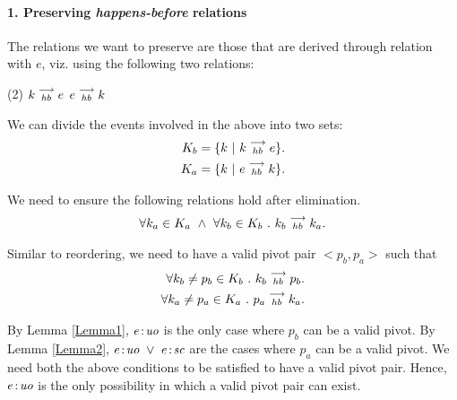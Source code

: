 \paragraph{1. Preserving \emph{happens-before} relations}
        The relations we want to preserve are those that are derived through relation with $e$, viz. using the following two relations:
        \begin{tasks}(2)
            \task $k\stackrel{\longrightarrow}{_{hb}}e$
            \task $e\stackrel{\longrightarrow}{_{hb}}k$
        \end{tasks}

        We can divide the events involved in the above into two sets:
        \begin{align*}
            K_b = \{k \ | \ k\stackrel{\longrightarrow}{_{hb}}e \}. \\
            K_a = \{k \ | \ e\stackrel{\longrightarrow}{_{hb}}k \}. 
        \end{align*}

        We need to ensure the following relations hold after elimination.
        \begin{align*}
            \forall k_a \in K_a \ \wedge \ \forall k_b \in K_b \ . \ \reln{k_b}{hb}{k_a}.
        \end{align*}

        Similar to reordering, we need to have a valid pivot pair $<p_b, p_a>$ such that 
        \begin{align*}
            \forall k_b \neq p_b \in K_b \ . \ k_b\stackrel{\longrightarrow}{_{hb}}p_b. \\
            \forall k_a \neq p_a \in K_a \ . \ p_a\stackrel{\longrightarrow}{_{hb}}k_a. 
        \end{align*}

        By Lemma \ref{Lemma1}, $e\!:\!\textit{uo}$ is the only case where $p_b$ can be a valid pivot. 
        By Lemma \ref{Lemma2}, $e\!:\!\textit{uo} \ \vee \ e\!:\!\textit{sc}$ are the cases where $p_a$ can be a valid pivot. 
        We need both the above conditions to be satisfied to have a valid pivot pair. 
        Hence, $e\!:\!\textit{uo}$ is the only possibility in which a valid pivot pair can exist. 